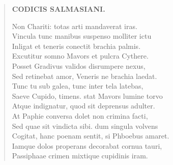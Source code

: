 \documentclass[11pt, a4paper]{report}
\begin{document}
\begin{verse}
    \begin{center} \textbf{CODICIS SALMASIANI.} \end{center} \marginpar{[209]} Non Chariti: totas arti mandaverat iras. \\ Vincula tunc manibus suspenso molliter ictu \\ Inligat et teneris conectit brachia palmis. \\ Excutitur somno Mavors et pulcra Cythere. \\ Posset Gradivus validos disrumpere nexus, \\ Sed retinebat amor, Veneris ne brachia laedat. \\ Tunc tu sub galea, tunc inter tela latebas, \\ Saeve Cupido, timens. stat Mavors lumine torvo \\ Atque indignatur, quod sit deprensus adulter. \\ At Paphie conversa dolet non crimina facti, \\ Sed quae sit vindicta sibi. dum singula volvens \\ Cogitat, hanc poenam sentit, si Phboebus amaret. \\ Iamque dolos properans decorabat cornua tauri, \\ Passiphaae crimen mixtique cupidinis iram. \\ 
      \end{verse}
  
\end{document}
